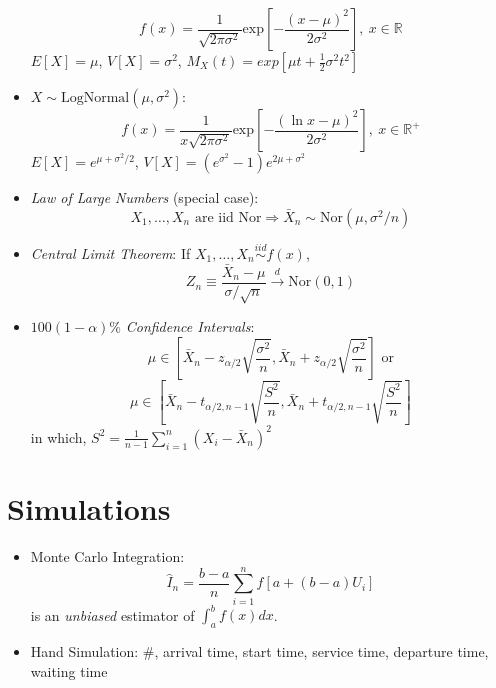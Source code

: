\documentclass[10pt, twocolumn]{article}
\begin{document}
\begin{itemize}
\[ f(x) = \frac{1}{\sqrt{2\pi\sigma^2}}\text{exp}\left[-\frac{(x-\mu)^2}{2\sigma^2}\right],\ x\in\mathbb{R} \]
$E[X]=\mu$, $V[X]=\sigma^2$, $M_X(t)=exp[\mu t+\frac{1}{2}\sigma^2t^2]$
\item $X\sim \text{LogNormal}(\mu,\sigma^2)$:
\[ f(x) = \frac{1}{x\sqrt{2\pi\sigma^2}}\text{exp}\left[-\frac{(\ln x-\mu)^2}{2\sigma^2}\right],\ x\in\mathbb{R}^+ \]
$E[X]=e^{\mu+\sigma^2/2}$, $V[X]=(e^{\sigma^2}-1)e^{2\mu+\sigma^2}$
\item \emph{Law of Large Numbers} (special case): 
\[ X_1,\dots,X_n \text{ are iid Nor} \Rightarrow \bar{X}_n\sim \text{Nor}(\mu,\sigma^2/n) \]
\item \emph{Central Limit Theorem}: If $X_1,\dots,X_n\stackrel{iid}{\sim}f(x)$, 
\[ Z_n\equiv \frac{\bar{X}_n-\mu}{\sigma/\sqrt{n}}\stackrel{d}{\longrightarrow}\text{Nor}(0,1) \]
\item $100(1-\alpha)\%$ \emph{Confidence Intervals}: 
\[ \mu\in[\bar{X}_n-z_{\alpha/2}\sqrt{\frac{\sigma^2}{n}},\bar{X}_n+z_{\alpha/2}\sqrt{\frac{\sigma^2}{n}}] \text{ or}\]
\[ \mu\in[\bar{X}_n-t_{\alpha/2,n-1}\sqrt{\frac{S^2}{n}},\bar{X}_n+t_{\alpha/2,n-1}\sqrt{\frac{S^2}{n}}] \]
in which, $S^2=\frac{1}{n-1}\sum_{i=1}^n(X_i-\bar{X}_n)^2$
\end{itemize}

\section*{Simulations}
\begin{itemize}
\item Monte Carlo Integration: 
\[ \hat{I}_n=\frac{b-a}{n}\sum_{i=1}^nf[a+(b-a)U_i] \]
is an \emph{unbiased} estimator of $\int_a^bf(x)dx$.
\item Hand Simulation: \#, arrival time, start time, service time, departure time, waiting time
\end{itemize}
\end{document}
